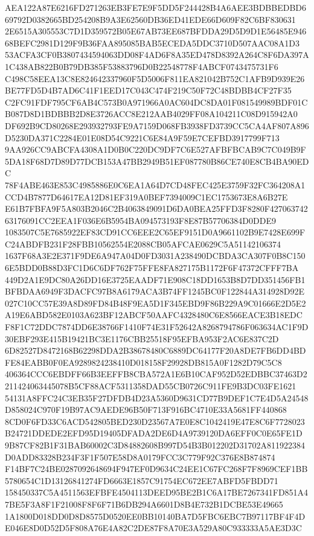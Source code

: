 \documentclass[UTF8,fontset=fandol,zihao=-4,a4paper]{ctexart}
\begin{document}
{{AEA122A87E6216FD271263EB3FE7E9F5DD5F244428B4A6AEE3BDBBEDBD669792D0382665BD254208B9A3E62560DB36ED41EDE66D609F82C6BF830631
2E6515A305553C7D1D359572B05E67AB73EE687BFDDA29D5D9D1E56485E94668BEFC2981D129F9B36FAA895085BAB5ECEDA5DDC3710D507AAC08A1D3
53ACFA3CF0B3807434594063DD08F4AD6F8A35ED478D8392A264C8F6DA397A1C438AB822B0B79DB385F53883796D0B22548778F4ABCF0743475731F6
C498C58EEA13C8E824642337960F5D5006F811EA821042B752C1AFB9D939E26BE77FD5D4B7AD6C41F1EED17C043C474F219C50F72C48BDBB4CF27F35
C2FC91FDF795CF6AB4C573B0A971966A0AC604DC8DA01F081549989BDF01CB087D8D1BDBBB2D8E3726ACC8E212AAB4029FF08A104211C08D915942A0
DF692B9CD80268E293932793FE9A7159D068FB3938FD3739CC5CA4AF807A896D5230DA371C2284E01E08D54C9221C6E84A9F59E7CEFBD3917799F713
9AA926CC9ABCFA4308A1D0B0C220DC9DF7C6E527AFBFBCAB9C7C049B9F5DA18F68D7D89D77DCB153A47BB2949B51EF087780B86CE740E8CB4BA90EDC
78F4ABE463E853C4985886E0C6EA1A64D7CD48FEC425E3759F32FC364208A1CCD4B7877D64617EA12D81EF319A0BEF7394009C1EC1753673E8A6B27E
E61B7FBFA9F5A803B2046C2B4063849091D6DA0BEA25FFD3F8280F42706374263176091CC2EEA1F036E6B5954BA094573193F8E87B57706384D0DDE9
1083507C5E7685922EF83CD91CC6EEE2C65EF9151D0A9661102B9E7428E699FC24ABDFB231F28FBB10562554E2088CB05AFCAE0629C5A51142106374
1637F68A3E2E371F9DE6A947A04D0FD3031A238490DCBDA3CA307F0B8C1506E5BDD0B88D3FC1D6C6DF762F75FFE8FA827175B1172F6F47372CFFF7BA
449D2A1E9DC80A26DD16E3725EAADF71E908C18DD1653B8D7DD351456FB1BFBDAA6949F3DACFC97B8A6179ACA3B74FF1245BC0F122844A314928D92E
027C10CC57E39A8D89FD84B48F9EA5D1F345EBD9F86B229A9C01666E2D5E2A19E6ABD582E0103A623BF12ABCF50AAFC4328480C6E8566EACE3B18EDC
F8F1C72DDC7874DD6E38766F1410F74E31F52642A8268794786F063634AC1F9D30EBF293E415B19421BC3E1176CBB25518F95EFBA953F2AC6E837C2D
6D82527D8472168B62298DDA2B38678480C6889DC64177F20A8DE7FB6DD4BDFE84EABB0F0EA9289824238410D018158F29928DB815A0F1282D79C5C8
406364CCC6EBDFF66B3EEFFB8CBA572A1E6B10CAF952D52EDBBC37463D2211424063445078B5CF88ACF5311358DAD55CB0726C911FE9B3DC03FE1621
54131A8FFC24C3EB35F27DFDB4D23A5360D9631CD77B9DEF1C7E4D5A24548D858024C970F19B97AC9AEDE96B50F713F916BC4710E33A5681FF440868
8CD0F6FD33C6ACD542805BED230D23567A7E0E8C1042419E47E8C6F7728023B24721DDEDE2EFD95D19405DFADA2DE6D4A9739120DA6EFF0C0E65FE1D
9B87CF82B1F31BAB60002C3D84882608B997D54B3B012202D31702A811922384D0ADD83328B234F3F1F507E58D8A0179FCC3C779F92C376E8B874874
F14BF7C24BE0287092648694F947EF0D9634C24EE1C67FC268F7F8969CEF1BB5780654C1D13126841274FD6663E1857C91754EC672EE7ABFD5FBDD71
158450337C5A4511563EFBFE4504113DEED95BE2B1C6A17BE7267341FD851A47BE5F3A8F1F21008F8F6F71B6DB294A6601D8B4E732B1DCBE53E49665
1A1800D018DD0D8D8575D0520EE0BB10140BA7D5FBC6EBC7B97117BF4F4DE046E8D0D52D5F808A76E4A82C2DE87F8A70E3A529A80C933333A5AE3D3C
}}
\end{document}
